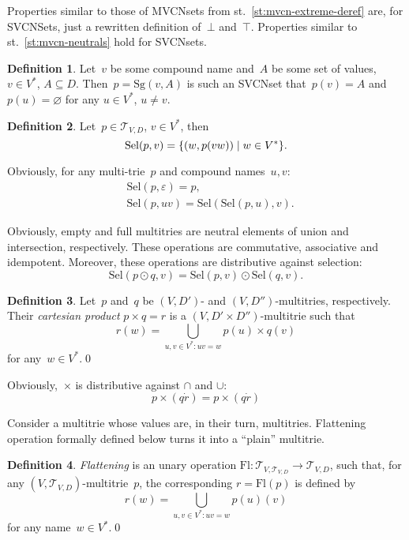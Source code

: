 \documentclass{article}
\theoremstyle{definition}
\newtheorem{Df}{Definition}
\newcommand{\setcharmt}{T}
\newcommand{\setsymbol}[3]{\mathcal{#1}_{#2,#3}}
\newcommand{\setmt}[2]{\setsymbol{\setcharmt}{#1}{#2}}
\newcommand{\flatten}{\mathrm{Fl}}
\newcommand{\select}{\mathrm{Sel}}
\newcommand{\singleleaf}{\mathrm{Sg}}
\begin{document}
Properties similar to those of MVCNsets from st.~\ref{st:mvcn-extreme-deref}
are, for SVCNSets, just a rewritten definition of~$\bot$ and~$\top$.
Properties similar to st.~\ref{st:mvcn-neutrals} hold for SVCNsets.


\begin{Df}
Let~$v$ be some compound name and~$A$ be some set of values, $v\in V^\ast$,
$A\subseteq D$.  Then~$p = \singleleaf(v,A)$ is such an SVCNset that~$p(v) =
A$ and~$p(u) = \varnothing$ for any $u\in V^\ast$, $u\neq v$.
\end{Df}

\begin{Df}\label{df:select}
Let~$p\in\setmt{V}{D}$, $v\in V^\ast$, then
\[
  \select(p,v) = \{ (w, p(vw)) \mid w\in V^\ast \} .\qedhere
\]
\end{Df}

Obviously, for any multi-trie~$p$ and compound names~$u,v$:
\begin{eqnarray*}
  & \select(p,\varepsilon) = p ,\\
  & \select(p,uv) = \select(\select(p,u), v) .
\end{eqnarray*}

Obviously, empty and full multitries are neutral elements of union and intersection,
respectively. These operations are commutative, associative and idempotent.
Moreover, these operations are distributive against selection:
\[
  \select(p\odot q, v) = \select(p, v) \odot \select(q, v) .
\]

\begin{Df}\label{df:cartesian}
Let~$p$ and~$q$ be $(V,D')$- and $(V,D'')$-multitries, respectively. Their
\emph{cartesian product} $p\times q = r$ is a $(V,D'\times D'')$-multitrie
such that
\[
  r(w) = \bigcup_{u,v\in V^\ast: uv = w} p(u) \times q(v)
\]
for any~$w\in V^\ast$.\qed
\end{Df}

Obviously,~$\times$ is distributive against $\cap$ and $\cup$:
\[
  p\times(q\dot r) = p\times(q\dot r)
\]

Consider a multitrie whose values are, in their turn, multitries.
Flattening operation formally defined below turns it into a ``plain'' multitrie.
\begin{Df}\label{df:flatten}
\emph{Flattening} is an unary operation $\flatten : \setmt{V}{\setmt{V}{D}}
\to\setmt{V}{D}$, such that, for any $(V,\setmt{V}{D})$-multitrie~$p$, the
corresponding $r=\flatten(p)$ is defined by
\[
  r(w) = \bigcup_{u,v\in V^\ast: uv = w} p(u)(v)
\]
for any name~$w\in V^\ast$.\qed
\end{Df}
\end{document}
